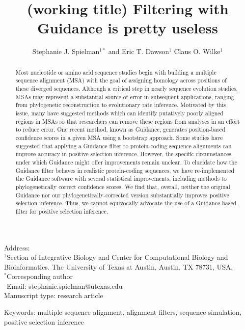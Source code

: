 \documentclass[10pt]{article}
\begin{document}
\title{\textbf{(working title) Filtering with Guidance is pretty useless}}
\author{Stephanie J. Spielman$^{1*}$ and Eric T. Dawson$^{1}$ Claus O. Wilke$^{1}$}
\date{}

\maketitle
\noindent
Address:\\
$^1$Section of Integrative Biology and Center for Computational Biology and Bioinformatics. The University
of Texas at Austin, Austin, TX 78731, USA.\\

\bigskip
\noindent
$^*$Corresponding author\\
$\phantom{^*}$Email: stephanie.spielman@utexas.edu\\

\bigskip
\noindent
Manuscript type: research article

\bigskip
\noindent Keywords: multiple sequence alignment, alignment filters, sequence simulation, positive selection inference

\newpage
\begin{abstract}
	Most nucleotide or amino acid sequence studies begin with building a multiple sequence alignment (MSA) with the goal of assigning homology across positions of these diverged sequences. Although a critical step in nearly sequence evolution studies, MSAs may represent a substantial source of error in subsequent applications, ranging from phylogenetic reconstruction to evolutionary rate inference. Motivated by this issue, many have suggested methods which can identify putatively poorly aligned regions in MSAs so that researchers can remove these regions from analyses in an effort to reduce error. One recent method, known as Guidance, generates position-based confidence scores in a given MSA using a bootstrap approach. Some studies have suggested that applying a Guidance filter to protein-coding sequence alignments can improve accuracy in positive selection inference. However, the specific circumstances under which Guidance might offer improvements remain unclear. To elucidate how the Guidance filter behaves in realistic protein-coding sequences, we have re-implemented the Guidance software with several statistical improvements, including methods to phylogenetically correct confidence scores. We find that, overall, neither the original Guidance nor our phylogenetically-corrected version substantially improves positive selection inference. Thus, we cannot equivocally advocate the use of a Guidance-based filter for positive selection inference.
\end{abstract}
\end{document}
